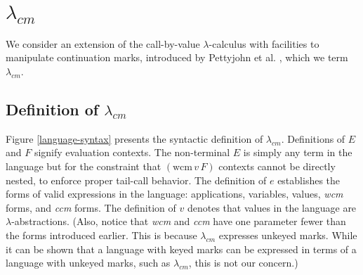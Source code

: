 \documentclass[ms,electronic,twosidetoc,letterpaper,chaptercenter,parttop]{byumsphd}
\begin{document}




\chapter{$\lambda_{cm}$}

We consider an extension of the call-by-value $\lambda$-calculus with facilities to
manipulate continuation marks, introduced by Pettyjohn et al.
\cite{pettyjohn2005continuations}, which we term $\lambda_{cm}$.

\section{Definition of $\lambda_{cm}$}

Figure \ref{language-syntax} presents the syntactic definition of $\lambda_{cm}$.
Definitions of $E$ and $F$ signify evaluation contexts. The non-terminal $E$ is simply any
term in the language but for the constraint that $(\mathrm{wcm}\,v\,F)$ contexts cannot be
directly nested, to enforce proper tail-call behavior. The definition of $e$ establishes the forms of valid expressions in the
language: applications, variables, values, \emph{wcm} forms, and \emph{ccm} forms. The
definition of $v$ denotes that values in the language are $\lambda$-abstractions. (Also,
notice that \emph{wcm} and \emph{ccm} have one parameter fewer than the forms introduced
earlier. This is because $\lambda_{cm}$ expresses unkeyed marks. While it can be shown
that a language with keyed marks can be expressed in terms of a language with unkeyed
marks, such as $\lambda_{cm}$, this is not our concern.)
\end{document}
